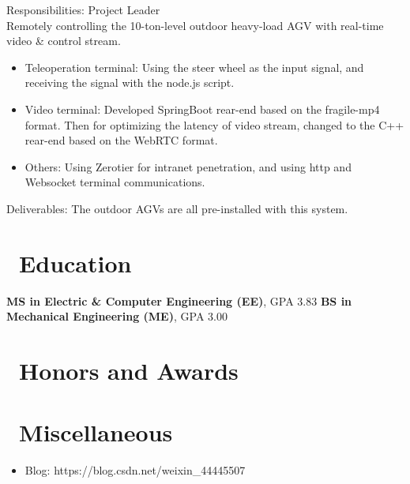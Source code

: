\documentclass[a4paper,10pt]{resume}
\begin{document}
Responsibilities: Project Leader
\\Remotely controlling the 10-ton-level outdoor heavy-load AGV with real-time video \& control stream.
\begin{itemize}[parsep=0.5ex]
  \item Teleoperation terminal: Using the steer wheel as the input signal, and receiving the signal with the node.js script.
  \item Video terminal: Developed SpringBoot rear-end based on the fragile-mp4 format. Then for optimizing the latency of video stream, changed to the C++ rear-end based on the WebRTC format.
  \item Others: Using Zerotier for intranet penetration, and using http and Websocket terminal communications.
\end{itemize}
Deliverables: The outdoor AGVs are all pre-installed with this system.

\section{\faGraduationCap\ Education}
\textbf{MS in Electric \& Computer Engineering (EE)}, GPA 3.83
\textbf{BS in Mechanical Engineering (ME)}, GPA 3.00

\section{\faHeartO\ Honors and Awards}

\section{\faInfo\ Miscellaneous}
\begin{itemize}[parsep=0.5ex]
  \item Blog: https://blog.csdn.net/weixin\_44445507
\end{itemize}

%
%
\end{document}
